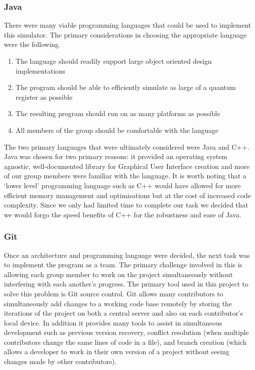 \documentclass[bibliography=totocnumbered, 10pt]{article}
\theoremstyle{NoticeStyle}
\begin{document}
\subsubsection{Java}
There were many viable programming languages that could be used to implement this simulator. The primary considerations in choosing the appropriate language were the following.
\begin{enumerate}
	\item The language should readily support large object oriented design implementations
	\item The program should be able to efficiently simulate as large of a quantum register as possible
	\item The resulting program should run on as many platforms as possible
	\item All members of the group should be comfortable with the language
\end{enumerate}
The two primary languages that were ultimately considered were Java and C++. Java was chosen for two primary reasons: it provided an operating system agnostic, well-documented library for Graphical User Interface creation and more of our group members were familiar with the language. It is worth noting that a `lower level' programming language such as C++ would have allowed for more efficient memory management and optimisations but at the cost of increased code complexity. Since we only had limited time to complete our task we decided that we would forgo the speed benefits of C++ for the robustness and ease of Java.

\subsubsection{Git}
Once an architecture and programming language were decided, the next task was to implement the program as a team. The primary challenge involved in this is allowing each group member to work on the project simultaneously without interfering with each another's progress.  The primary tool used in this project to solve this problem is Git source control. Git allows many contributors to simultaneously add changes to a working code base remotely by storing the iterations of the project on both a central server and also on each contributor's local device. In addition it provides many tools to assist in simultaneous development such as previous version recovery, conflict resolution (when multiple contributors change the same lines of code in a file), and branch creation (which allows a developer to work in their own version of a project without seeing changes made by other contributors).   
\end{document}
